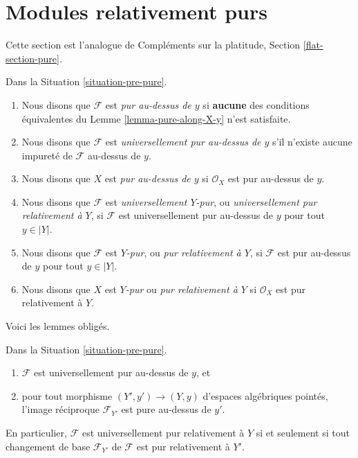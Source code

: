 \section{Modules relativement purs}
\label{section-pure}

\noindent
Cette section est l'analogue de
Compléments sur la platitude, Section \ref{flat-section-pure}.

\begin{definition}
\label{definition-pure}
Dans la Situation \ref{situation-pre-pure}.
\begin{enumerate}
\item Nous disons que $\mathcal{F}$ est {\it pur au-dessus de $y$} si {\bf aucune} des
conditions équivalentes du Lemme \ref{lemma-pure-along-X-y} n'est satisfaite.
\item Nous disons que $\mathcal{F}$ est {\it universellement pur au-dessus de $y$}
s'il n'existe aucune impureté de $\mathcal{F}$ au-dessus de $y$.
\item Nous disons que $X$ est {\it pur au-dessus de $y$} si $\mathcal{O}_X$
est pur au-dessus de $y$.
\item Nous disons que $\mathcal{F}$ est {\it universellement $Y$-pur}, ou
{\it universellement pur relativement à $Y$}, si $\mathcal{F}$ est universellement
pur au-dessus de $y$ pour tout $y \in |Y|$.
\item Nous disons que $\mathcal{F}$ est {\it $Y$-pur}, ou
{\it pur relativement à $Y$}, si $\mathcal{F}$ est pur au-dessus de $y$
pour tout $y \in |Y|$.
\item Nous disons que $X$ est {\it $Y$-pur} ou {\it pur relativement à $Y$}
si $\mathcal{O}_X$ est pur relativement à $Y$.
\end{enumerate}
\end{definition}

\noindent
Voici les lemmes obligés.

\begin{lemma}
\label{lemma-base-change-universally}
Dans la Situation \ref{situation-pre-pure}.
\begin{enumerate}
\item $\mathcal{F}$ est universellement pur au-dessus de $y$, et
\item pour tout morphisme $(Y', y') \to (Y, y)$ d'espaces algébriques pointés,
l'image réciproque $\mathcal{F}_{Y'}$ est pure au-dessus de $y'$.
\end{enumerate}
En particulier, $\mathcal{F}$ est universellement pur relativement à $Y$ si et
seulement si tout changement de base $\mathcal{F}_{Y'}$ de $\mathcal{F}$ est
pur relativement à $Y'$.
\end{lemma}

